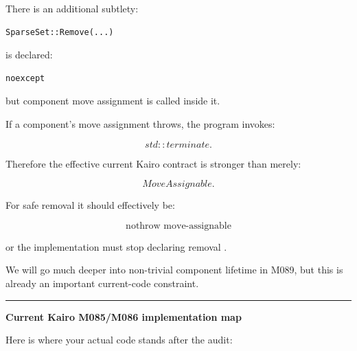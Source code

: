 There is an additional subtlety:

\begin{verbatim}
SparseSet::Remove(...)
\end{verbatim}

is declared:

\begin{verbatim}
noexcept
\end{verbatim}

but component move assignment is called inside it.

If a component's move assignment throws, the program invokes:

\[
std::terminate.
\]

Therefore the effective current Kairo contract is stronger than merely:

\[
MoveAssignable.
\]

For safe removal it should effectively be:

\[
\boxed{
\text{nothrow move-assignable}
}
\]

or the implementation must stop declaring removal .

We will go much deeper into non-trivial component lifetime in M089, but this is already an important current-code constraint.

\begin{center}\rule{0.5\linewidth}{0.5pt}\end{center}

\textbf{Current Kairo M085/M086 implementation map}

Here is where your actual code stands after the audit:

